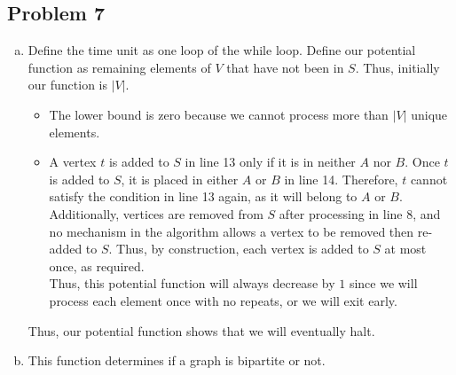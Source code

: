 \documentclass[12pt, letterpaper]{article}
\theoremstyle{definition}
\begin{document}
\subsection*{Problem 7}
\begin{enumerate}[(a)]
    \item Define the time unit as one loop of the while loop. Define our potential function as remaining elements of $V$ that have not been in $S$. Thus, initially our function is $|V|$.
    \begin{itemize}
        \item The lower bound is zero because we cannot process more than $|V|$ unique elements.
        \item A vertex \( t \) is added to \( S \) in line 13 only if it is in neither \( A \) nor \( B \). 
        Once \( t \) is added to \( S \), it is placed in either \( A \) or \( B \) in line 14. 
        Therefore, \( t \) cannot satisfy the condition in line 13 again, as it will belong to \( A \) or \( B \). 
        Additionally, vertices are removed from \( S \) after processing in line 8, and no mechanism in the algorithm allows a vertex to be removed then re-added to \( S \). 
        Thus, by construction, each vertex is added to \( S \) at most once, as required.\\
        Thus, this potential function will always decrease by $1$ since we will process each element once with no repeats, or we will exit early.
    \end{itemize}
    Thus, our potential function shows that we will eventually halt.
    \item This function determines if a graph is bipartite or not.
\end{enumerate}
\end{document}
